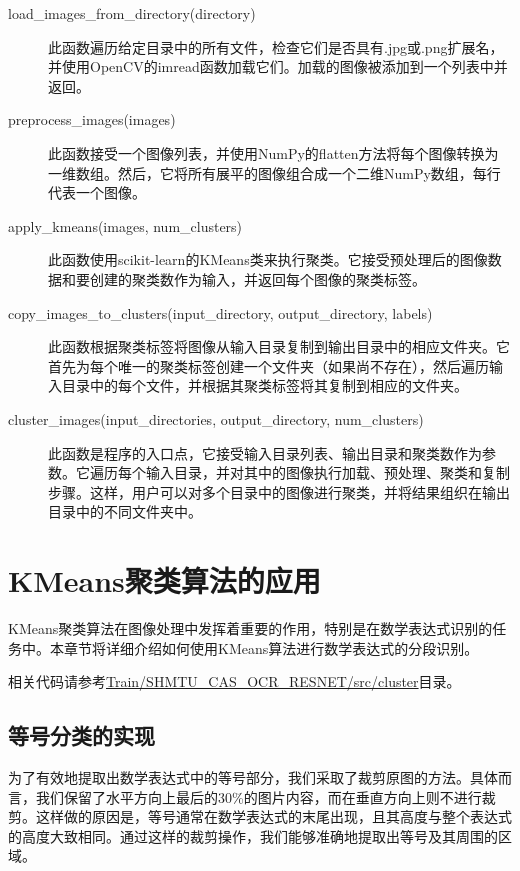 \begin{description}
	\item[load\_images\_from\_directory(directory)]
	此函数遍历给定目录中的所有文件，检查它们是否具有.jpg或.png扩展名，并使用OpenCV的imread函数加载它们。加载的图像被添加到一个列表中并返回。

	\item[preprocess\_images(images)]
	此函数接受一个图像列表，并使用NumPy的flatten方法将每个图像转换为一维数组。然后，它将所有展平的图像组合成一个二维NumPy数组，每行代表一个图像。

	\item[apply\_kmeans(images, num\_clusters)]
	此函数使用scikit-learn的KMeans类来执行聚类。它接受预处理后的图像数据和要创建的聚类数作为输入，并返回每个图像的聚类标签。

	\item[copy\_images\_to\_clusters(input\_directory, output\_directory, labels)]
	此函数根据聚类标签将图像从输入目录复制到输出目录中的相应文件夹。它首先为每个唯一的聚类标签创建一个文件夹（如果尚不存在），然后遍历输入目录中的每个文件，并根据其聚类标签将其复制到相应的文件夹。

	\item[cluster\_images(input\_directories, output\_directory, num\_clusters)]
	此函数是程序的入口点，它接受输入目录列表、输出目录和聚类数作为参数。它遍历每个输入目录，并对其中的图像执行加载、预处理、聚类和复制步骤。这样，用户可以对多个目录中的图像进行聚类，并将结果组织在输出目录中的不同文件夹中。
\end{description}

\section{KMeans聚类算法的应用}

KMeans聚类算法在图像处理中发挥着重要的作用，特别是在数学表达式识别的任务中。本章节将详细介绍如何使用KMeans算法进行数学表达式的分段识别。

相关代码请参考\url{Train/SHMTU_CAS_OCR_RESNET/src/cluster}目录。

\subsection{等号分类的实现}

为了有效地提取出数学表达式中的等号部分，我们采取了裁剪原图的方法。具体而言，我们保留了水平方向上最后的30\%的图片内容，而在垂直方向上则不进行裁剪。这样做的原因是，等号通常在数学表达式的末尾出现，且其高度与整个表达式的高度大致相同。通过这样的裁剪操作，我们能够准确地提取出等号及其周围的区域。

